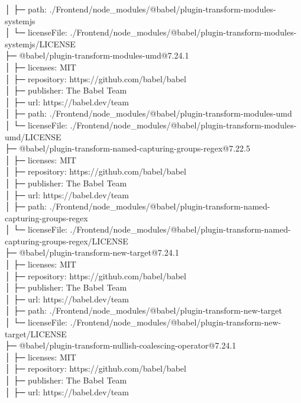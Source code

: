 │  ├─ path: ./Frontend/node\_modules/@babel/plugin-transform-modules-systemjs\\
│  └─ licenseFile: ./Frontend/node\_modules/@babel/plugin-transform-modules-systemjs/LICENSE\\
├─ @babel/plugin-transform-modules-umd@7.24.1\\
│  ├─ licenses: MIT\\
│  ├─ repository: https://github.com/babel/babel\\
│  ├─ publisher: The Babel Team\\
│  ├─ url: https://babel.dev/team\\
│  ├─ path: ./Frontend/node\_modules/@babel/plugin-transform-modules-umd\\
│  └─ licenseFile: ./Frontend/node\_modules/@babel/plugin-transform-modules-umd/LICENSE\\
├─ @babel/plugin-transform-named-capturing-groups-regex@7.22.5\\
│  ├─ licenses: MIT\\
│  ├─ repository: https://github.com/babel/babel\\
│  ├─ publisher: The Babel Team\\
│  ├─ url: https://babel.dev/team\\
│  ├─ path: ./Frontend/node\_modules/@babel/plugin-transform-named-capturing-groups-regex\\
│  └─ licenseFile: ./Frontend/node\_modules/@babel/plugin-transform-named-capturing-groups-regex/LICENSE\\
├─ @babel/plugin-transform-new-target@7.24.1\\
│  ├─ licenses: MIT\\
│  ├─ repository: https://github.com/babel/babel\\
│  ├─ publisher: The Babel Team\\
│  ├─ url: https://babel.dev/team\\
│  ├─ path: ./Frontend/node\_modules/@babel/plugin-transform-new-target\\
│  └─ licenseFile: ./Frontend/node\_modules/@babel/plugin-transform-new-target/LICENSE\\
├─ @babel/plugin-transform-nullish-coalescing-operator@7.24.1\\
│  ├─ licenses: MIT\\
│  ├─ repository: https://github.com/babel/babel\\
│  ├─ publisher: The Babel Team\\
│  ├─ url: https://babel.dev/team\\
